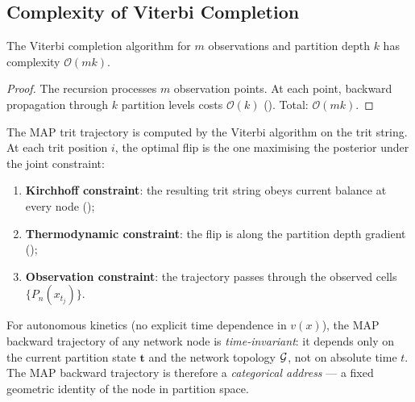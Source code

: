 \subsection{Complexity of Viterbi Completion}

\begin{theorem}
\label{thm:viterbi-complexity}
The Viterbi completion algorithm for $m$ observations and partition depth $k$
has complexity $\mathcal{O}(mk)$.
\end{theorem}

\begin{proof}
The recursion  processes $m$ observation points.  At
each point, backward propagation through $k$ partition levels costs
$\mathcal{O}(k)$ ().  Total: $\mathcal{O}(mk)$.
\end{proof}

\begin{definition}
\label{def:viterbi}
The MAP trit trajectory is computed by the Viterbi algorithm on the trit
string.  At each trit position $i$, the optimal flip is the one maximising
the posterior under the joint constraint:
\begin{enumerate}[label=(\alph*)]
    \item \textbf{Kirchhoff constraint}: the resulting trit string obeys
          current balance at every node ();
    \item \textbf{Thermodynamic constraint}: the flip is along the partition
          depth gradient ();
    \item \textbf{Observation constraint}: the trajectory passes through the
          observed cells $\{P_n(x_{t_j})\}$.
\end{enumerate}
\end{definition}

\begin{theorem}
\label{thm:time-invariance}
For autonomous kinetics (no explicit time dependence in $v(x)$), the MAP
backward trajectory of any network node is \emph{time-invariant}: it depends
only on the current partition state $\mathbf{t}$ and the network topology
$\mathcal{G}$, not on absolute time $t$.  The MAP backward trajectory is therefore
a \emph{categorical address} --- a fixed geometric identity of the node in
partition space.
\end{theorem}

